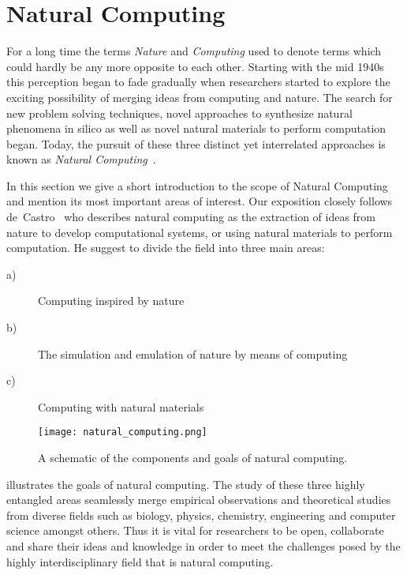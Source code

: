 \section{Natural Computing}

	For a long time the terms \emph{Nature} and \emph{Computing} used to denote terms which could hardly be any more opposite to each other. Starting with the mid 1940s this perception began to fade gradually when researchers started to explore the exciting possibility of merging ideas from computing and nature. The search for new problem solving techniques, novel approaches to synthesize natural phenomena in silico as well as novel natural materials to perform computation began. Today, the pursuit of these three distinct yet interrelated approaches is known as \emph{Natural Computing}~\cite{de2005natural,de2006fundamentals}.

	In this section we give a short introduction to the scope of Natural Computing and mention its most important areas of interest. Our exposition closely follows de~Castro~\cite{de2007fundamentals} who describes natural computing as the extraction of ideas from nature to develop computational systems, or using natural materials to perform computation. He suggest to divide the field into three main areas:

	\begin{description}
		\item[a)] Computing inspired by nature
		\item[b)] The simulation and emulation of nature by means of computing
		\item[c)] Computing with natural materials
	\end{description}

	\begin{figure}
			\centering
			\texttt{[image: natural\_computing.png]}
			\caption[The goals of natural computing.]{A schematic of the components and goals of natural computing.}
			\label{fig:natural_computing}
	\end{figure}

	 illustrates the goals of natural computing. The study of these three highly entangled areas seamlessly merge empirical observations and theoretical studies from diverse fields such as biology, physics, chemistry, engineering and computer science amongst others. Thus it is vital for researchers to be open, collaborate and share their ideas and knowledge in order to meet the challenges posed by the highly interdisciplinary field that is natural computing.

